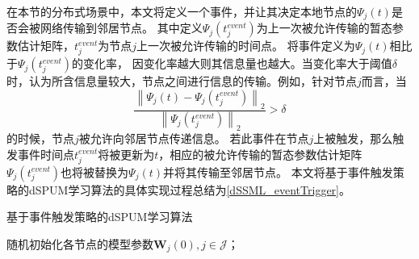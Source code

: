 在本节的分布式场景中，本文将定义一个事件，并让其决定本地节点的$\boldsymbol\varPsi_j\left(t\right)$是否会被网络传输到邻居节点。
其中定义$\boldsymbol\varPsi_j\left(t_j^{event}\right)$为上一次被允许传输的暂态参数估计矩阵，$t_j^{event}$为节点$j$上一次被允许传输的时间点。
{将事件定义为$\boldsymbol\varPsi_j\left(t\right)$相比于$\boldsymbol\varPsi_j\left(t_j^{event}\right)$的变化率，
因变化率越大则其信息量也越大。当变化率大于阈值$\delta$时，认为所含信息量较大，节点之间进行信息的传输。例如，针对节点$j$而言，当}
\begin{equation}
    \label{event_trigger}
    \frac{\left\|\boldsymbol\varPsi_j\left(t\right) - \boldsymbol\varPsi_j\left(t_j^{event}\right)\right\|_2}
    {\left\|\boldsymbol\varPsi_j\left(t_j^{event}\right)\right\|_2} > \delta
\end{equation}
{的时候，节点$j$被允许向邻居节点传递信息。}
若此事件在节点$j$上被触发，那么触发事件时间点$t_j^{event}$将被更新为$t$，相应的被允许传输的暂态参数估计矩阵
$\boldsymbol\varPsi_j\left(t_j^{event}\right)$也将被替换为$\boldsymbol\varPsi_j\left(t\right)$并将其传输至邻居节点。
本文将基于事件触发策略的dSPUM学习算法的具体实现过程总结为\autoref{dSSML_eventTrigger}。
\begin{algorithm}[htbp]
	\caption{基于事件触发策略的dSPUM学习算法}
	\label{dSSML_eventTrigger}
	\LinesNumbered
	{随机初始化各节点的模型参数$\boldsymbol{W}_j\left(0\right), j \in \mathcal{J}$}；\\
\end{algorithm}

